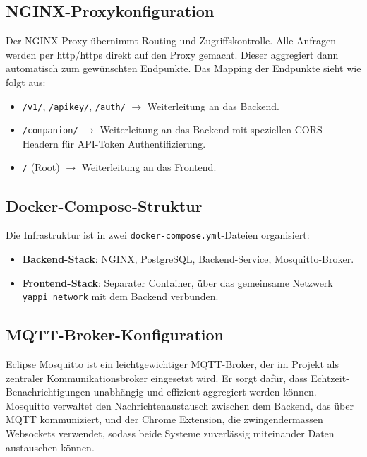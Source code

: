 \documentclass[12pt,a4paper]{report}
\begin{document}
    \subsection{NGINX-Proxykonfiguration}

        Der NGINX-Proxy übernimmt Routing und Zugriffskontrolle. Alle Anfragen werden per http/https direkt auf den Proxy gemacht.
        Dieser aggregiert dann automatisch zum gewünschten Endpunkte. Das Mapping der Endpunkte sieht wie folgt aus:

        \begin{itemize}
            \item \texttt{/v1/}, \texttt{/apikey/}, \texttt{/auth/} $\rightarrow$ Weiterleitung an das Backend.
            \item \texttt{/companion/} $\rightarrow$ Weiterleitung an das Backend mit speziellen CORS-Headern für API-Token Authentifizierung.
            \item \texttt{/} (Root) $\rightarrow$ Weiterleitung an das Frontend.
        \end{itemize}

    \subsection{Docker-Compose-Struktur}

    Die Infrastruktur ist in zwei \texttt{docker-compose.yml}-Dateien organisiert:

    \begin{itemize}
        \item \textbf{Backend-Stack}: NGINX, PostgreSQL, Backend-Service, Mosquitto-Broker.
        \item \textbf{Frontend-Stack}: Separater Container, über das gemeinsame Netzwerk \texttt{yappi\_network} mit dem Backend verbunden.
    \end{itemize}

    \subsection{MQTT-Broker-Konfiguration}

    Eclipse Mosquitto ist ein leichtgewichtiger MQTT-Broker, der im Projekt als zentraler Kommunikationsbroker eingesetzt wird.
    Er sorgt dafür, dass Echtzeit-Benachrichtigungen unabhängig und effizient aggregiert werden können.
    Mosquitto verwaltet den Nachrichtenaustausch zwischen dem Backend, das über MQTT kommuniziert, und der Chrome Extension, die zwingendermassen Websockets verwendet,
    sodass beide Systeme zuverlässig miteinander Daten austauschen können.
\end{document}
